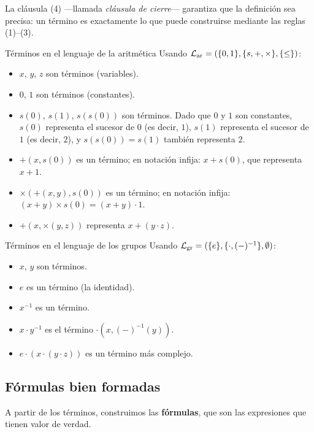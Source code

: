 La cláusula (4) —llamada \emph{cláusula de cierre}— garantiza que la definición sea precisa: un término es exactamente lo que puede construirse mediante las reglas (1)--(3).

\begin{ejemplo}{Términos en el lenguaje de la aritmética}{}
Usando $\mathcal{L}_{\mathrm{ar}} = (\{0,1\}, \{s,+,\times\}, \{\leq\})$:
\begin{itemize}
  \item $x$, $y$, $z$ son términos (variables).
  \item $0$, $1$ son términos (constantes).
  \item $s(0)$, $s(1)$, $s(s(0))$ son términos. Dado que $0$ y $1$ son constantes, $s(0)$ representa el sucesor de $0$ (es decir, $1$), $s(1)$ representa el sucesor de $1$ (es decir, $2$), y $s(s(0)) = s(1)$ también representa $2$.
  \item $+(x, s(0))$ es un término; en notación infija: $x + s(0)$, que representa $x + 1$.
  \item $\times(+(x,y), s(0))$ es un término; en notación infija: $(x+y) \times s(0) = (x+y)\cdot 1$.
  \item $+(x, \times(y, z))$ representa $x + (y \cdot z)$.
\end{itemize}
\end{ejemplo}

\begin{ejemplo}{Términos en el lenguaje de los grupos}{}
Usando $\mathcal{L}_{\mathrm{gr}} = (\{e\}, \{\cdot, (-)^{-1}\}, \emptyset)$:
\begin{itemize}
  \item $x$, $y$ son términos.
  \item $e$ es un término (la identidad).
  \item $x^{-1}$ es un término.
  \item $x \cdot y^{-1}$ es el término $\cdot(x, (-)^{-1}(y))$.
  \item $e \cdot (x \cdot (y \cdot z))$ es un término más complejo.
\end{itemize}
\end{ejemplo}

\subsection{Fórmulas bien formadas}

A partir de los términos, construimos las \textbf{fórmulas}, que son las expresiones que tienen valor de verdad.

